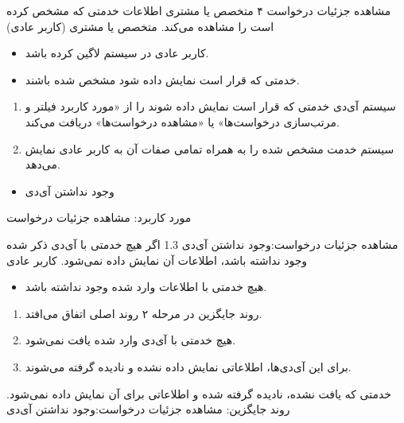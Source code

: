 {
	\usecase
	{مشاهده جزئیات درخواست}
	{۴}
	{متخصص یا مشتری اطلاعات خدمتی که مشخص کرده است را مشاهده می‌کند.}
	{متخصص یا مشتری (کاربر عادی)}
	{}
	{
		\begin{itemize}
			\item
			کاربر عادی در سیستم لاگین کرده باشد.
			
			\item
			‌خدمتی که قرار است نمایش داده شود مشخص شده باشند.
		\end{itemize}
	}
	{
		\begin{enumerate}
			\item 
			سیستم آی‌دی خدمتی که قرار است نمایش داده شوند را از «مورد کاربرد  فیلتر و مرتب‌سازی درخواست‌ها»  یا «مشاهده درخواست‌ها» دریافت می‌کند.
			
			\item
			سیستم خدمت مشخص شده را به همراه تمامی صفات آن به کاربر عادی نمایش می‌دهد.
		\end{enumerate}
	}
	{
	}
	{
		\begin{itemize}
			\item 
			وجود نداشتن آی‌دی‌
		\end{itemize}
	}
	{مورد کاربرد: مشاهده جزئیات درخواست}
	
	\alternativeflow
	{
		مشاهده جزئیات درخواست:وجود‌ نداشتن آی‌دی‌
	}
	{1.3}
	{
		اگر هیچ خدمتی با آی‌دی‌ ذکر شده وجود نداشته باشد، اطلاعات آن نمایش داده نمی‌شود.
	}
	{
		کاربر عادی
	}
	{}
	{
		\begin{itemize}
			
			\item
			هیچ خدمتی با اطلاعات وارد شده وجود نداشته باشد.
		\end{itemize}
	}
	{
		\vspace*{-0.6cm}
		\begin{enumerate}
			\item 
			روند جایگزین در مرحله ۲ روند اصلی اتفاق می‌افتد.
			\item
			هیچ خدمتی با آی‌دی‌ وارد شده یافت نمی‌شود.
			\item 
			برای این آی‌دی‌ها، اطلاعاتی نمایش داده نشده و نادیده گرفته می‌شوند.
		\end{enumerate}
	}
	{
		خدمتی که یافت نشده‌، نادیده گرفته شده و اطلاعاتی برای آن نمایش داده نمی‌شود.
	}
	{
		روند جایگزین: مشاهده جزئیات درخواست:وجود‌ نداشتن آی‌دی‌
	}
}


